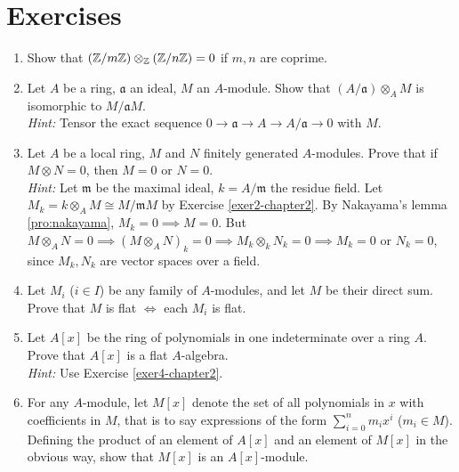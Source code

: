 \section*{Exercises}

\begin{enumerate}
    \item Show that $(\mathbb{Z}/m\mathbb{Z}) \otimes_{\mathbb{Z}} (\mathbb{Z}/n\mathbb{Z}) = 0$ if $m, n$ are coprime.

    \item \label{exer2-chapter2}Let $A$ be a ring, $\mathfrak{a}$ an ideal, $M$ an $A$-module. Show that $(A/\mathfrak{a}) \otimes_A M$ is isomorphic to $M/\mathfrak{a}M$.\\
    \textit{Hint:} Tensor the exact sequence $0 \to \mathfrak{a} \to A \to A/\mathfrak{a} \to 0$ with $M$.

    \item \label{exer3-chapter2}Let $A$ be a local ring, $M$ and $N$ finitely generated $A$-modules. Prove that if $M \otimes N = 0$, then $M = 0$ or $N = 0$.\\
    \textit{Hint:} Let $\mathfrak{m}$ be the maximal ideal, $k = A/\mathfrak{m}$ the residue field. Let $M_k = k \otimes_A M \cong M/\mathfrak{m}M$ by Exercise \ref{exer2-chapter2}. By Nakayama's lemma \eqref{pro:nakayama}, $M_k = 0 \implies M = 0$. But $M \otimes_A N = 0 \implies (M \otimes_A N)_k = 0 \implies M_k \otimes_k N_k = 0 \implies M_k = 0$ or $N_k = 0$, since $M_k, N_k$ are vector spaces over a field.

    \item \label{exer4-chapter2}Let $M_i$ ($i \in I$) be any family of $A$-modules, and let $M$ be their direct sum. Prove that $M$ is flat $\iff$ each $M_i$ is flat.

    \item \label{exer5-chapter2}Let $A[x]$ be the ring of polynomials in one indeterminate over a ring $A$. Prove that $A[x]$ is a flat $A$-algebra.\\
    \textit{Hint:} Use Exercise \ref{exer4-chapter2}.

    \item \label{exer6-chapter2}For any $A$-module, let $M[x]$ denote the set of all polynomials in $x$ with coefficients in $M$, that is to say expressions of the form $\sum_{i=0}^n m_i x^i$ ($m_i \in M$). Defining the product of an element of $A[x]$ and an element of $M[x]$ in the obvious way, show that $M[x]$ is an $A[x]$-module. 
    

\end{enumerate}
